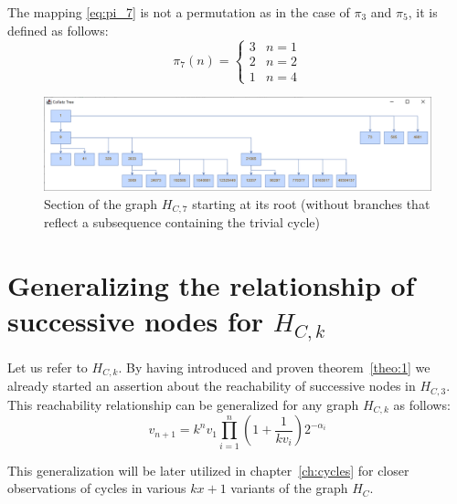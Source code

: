 The mapping \ref{eq:pi_7} is not a permutation as in the case of $\pi_3$ and $\pi_5$, it is defined as follows:
\begin{equation}
\label{eq:pi_7}
\pi_7(n)=\begin{cases}
3	&	n=1\\
2	&	n=2\\
1   &   n=4
\end{cases}	
\end{equation}

\begin{figure}[H]
	\includegraphics[width=1.00\textwidth]{figures/h_c7.png}
	\caption{Section of the graph $H_{C,7}$ starting at its root (without branches that reflect a subsequence containing the trivial cycle)}
	\label{fig:hc7}
\end{figure}

\section{\texorpdfstring{Generalizing the relationship of successive nodes for $H_{C,k}$}{Generalizing the relationship of successive nodes for HCk}}
Let us refer to $H_{C,k}$. By having introduced and proven theorem~\ref{theo:1} we already started an assertion about the reachability of successive nodes in $H_{C,3}$. This reachability relationship can be generalized for any graph $H_{C,k}$ as follows:
\begin{equation}
	\label{eq:generalized_reachability}
	v_{n+1}=k^nv_1\prod_{i=1}^{n}\left(1+\frac{1}{kv_{i}}\right)2^{-\alpha_i}
\end{equation}

This generalization will be later utilized in chapter~\ref{ch:cycles} for closer observations of cycles in various $kx+1$ variants of the graph $H_C$.

